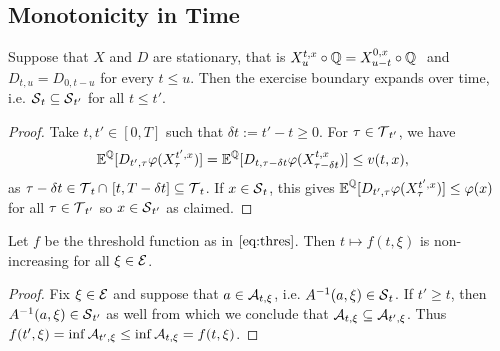 \subsection{Monotonicity in Time}

\begin{proposition}\label{prop:monot}
Suppose that  $X$ and $D$ are stationary, that is $   
        X_u^{t,x} \circ \operatorname{\mathbb{Q}} = X_{u-t}^{0,x} \circ  \operatorname{\mathbb{Q}} \ $  and $D_{t,u} = D_{0,t-u}$ for every $t \le u $. 
Then the exercise boundary  expands over time, i.e. 
$ \operatorname{\mathcal{S}}_t \subseteq \operatorname{\mathcal{S}}_{t'}$ for all $t \le  t' $.

\end{proposition}
\begin{proof}
Take $t,t'\in [0,T]$ such that $\delta t := t'-t \ge 0$. %
 For  $\tau \in \operatorname{\mathcal{T}}_{t'}$, we have
\begin{align*}
    \operatorname{\mathbb{E}}^{\operatorname{\mathbb{Q}}}[D_{t',\tau}\varphi(X^{t',x}_{\tau})] &= \operatorname{\mathbb{E}}^{\operatorname{\mathbb{Q}}}[D_{t,\tau - \delta t }\varphi(X^{t,x}_{\tau - \delta t})] \le v(t,x), 
\end{align*}
as $\tau - \delta t \in \operatorname{\mathcal{T}}_t \cap \ [t,T-\delta t] \subseteq \operatorname{\mathcal{T}}_t$. If  $x\in \operatorname{\mathcal{S}}_t$, this gives   
$\operatorname{\mathbb{E}}^{\operatorname{\mathbb{Q}}}[D_{t',\tau}\varphi(X^{t',x}_{\tau})] \le  \varphi(x)$ for all $ \tau \in \operatorname{\mathcal{T}}_{t'} $ so  $x \in \operatorname{\mathcal{S}}_{t'}$ as claimed. 
\end{proof}

\begin{corollary}
\label{cor:monot} Let $f$ be the threshold function  as  in $\eqref{eq:thres}$. Then $t \mapsto f(t,\xi)$  is non-increasing for all $\xi \in \operatorname{\mathcal{E}}$.
\end{corollary}
\begin{proof}  Fix $\xi \in \operatorname{\mathcal{E}}$ and suppose that $a \in \operatorname{\mathcal{A}}_{t,\xi}$, i.e. $A^{-1}(a,\xi) \in \operatorname{\mathcal{S}}_t$. If $t' \ge t$, then $A^{-1}(a,\xi) \in \operatorname{\mathcal{S}}_{t'}$ as well from which we conclude that $\operatorname{\mathcal{A}}_{t,\xi} \subseteq \operatorname{\mathcal{A}}_{t',\xi}$. Thus $f(t',\xi) = \inf \operatorname{\mathcal{A}}_{t',\xi} \le \inf \operatorname{\mathcal{A}}_{t,\xi} = f(t,\xi)$. 
\end{proof}

